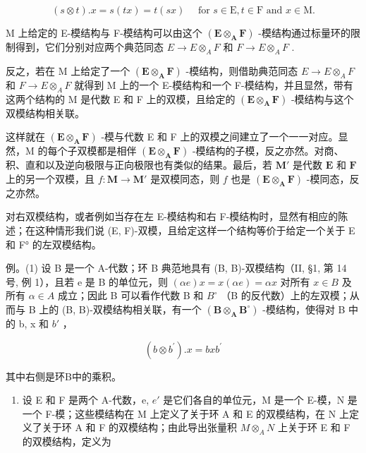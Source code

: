 \[
(s \otimes t). x = s (t x) = t (s x) \quad \text { for } s \in \mathrm{E}, t \in \mathrm{F} \text { and } x \in \mathrm{M}.
\]

M 上给定的 E-模结构与 F-模结构可以由这个 \((\mathbf{E} \otimes_{\mathbf{A}} \mathbf{F})\) -模结构通过标量环的限制得到，它们分别对应两个典范同态 \(E \to E \otimes_{A} F\) 和 \(F \to E \otimes_{A} F\) .

反之，若在 M 上给定了一个 \((\mathbf{E} \otimes_{\mathbf{A}} \mathbf{F})\) -模结构，则借助典范同态 \(E \to E \otimes_{A} F\) 和 \(F \to E \otimes_{A} F\) 就得到 M 上的一个 E-模结构和一个 F-模结构，并且显然，带有这两个结构的 M 是代数 E 和 F 上的双模，且给定的 \((\mathbf{E} \otimes_{\mathbf{A}} \mathbf{F})\) -模结构与这个双模结构相关联。

这样就在 \((\mathbf{E} \otimes_{\mathbf{A}} \mathbf{F})\) -模与代数 E 和 F 上的双模之间建立了一个一一对应。显然，M 的每个子双模都是相伴 \((\mathbf{E} \otimes_{\mathbf{A}} \mathbf{F})\) -模结构的子模，反之亦然。对商、积、直和以及逆向极限与正向极限也有类似的结果。最后，若 \(\mathbf{M}'\) 是代数 \(\mathbf{E}\) 和 \(\mathbf{F}\) 上的另一个双模，且 \(f\colon \mathbf{M}\to \mathbf{M}'\) 是双模同态，则 \(f\) 也是 \((\mathbf{E}\otimes_{\mathbf{A}}\mathbf{F})\) -模同态，反之亦然。

对右双模结构，或者例如当存在左 E-模结构和右 F-模结构时，显然有相应的陈述；在这种情形我们说 (E, F)-双模，且给定这样一个结构等价于给定一个关于 E 和 F° 的左双模结构。

例。(1) 设 B 是一个 A-代数；环 B 典范地具有 (B, B)-双模结构（II, §1, 第 14 号, 例 1），且若 e 是 B 的单位元，则 \((\alpha e)x = x(\alpha e) = \alpha x\) 对所有 \(x \in B\) 及所有 \(\alpha \in A\) 成立；因此 B 可以看作代数 B 和 \(B^{\circ}\) （B 的反代数）上的左双模；从而与 B 上的 (B, B)-双模结构相关联，有一个 \((\mathbf{B} \otimes_{\mathbf{A}} \mathbf{B}^{\circ})\) -模结构，使得对 B 中的 b, x 和 \(b'\) ，

\[
(b \otimes b ^ {\prime}). x = b x b ^ {\prime}\tag{9}
\]

其中右侧是环B中的乘积。

\begin{enumerate}
\def\labelenumi{(\arabic{enumi})}
\setcounter{enumi}{1}
\tightlist
\item
  设 E 和 F 是两个 A-代数，e, \(e'\) 是它们各自的单位元，M 是一个 E-模，N 是一个 F-模；这些模结构在 M 上定义了关于环 A 和 E 的双模结构，在 N 上定义了关于环 A 和 F 的双模结构；由此导出张量积 \(M \otimes_{A} N\) 上关于环 E 和 F 的双模结构，定义为
\end{enumerate}

